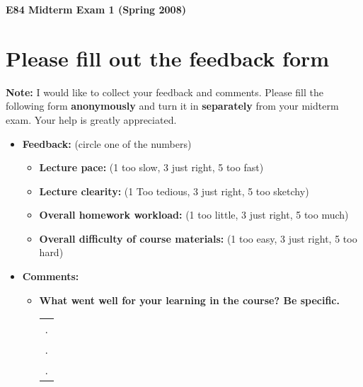 \usepackage{html}

\begin{center}
{\Large \bf  E84 Midterm Exam 1 (Spring 2008)}
\end{center}

\section*{Please fill out the feedback form}

{\bf Note: } I would like to collect your feedback and comments. Please fill
the following form {\bf anonymously} and turn it in {\bf separately} from your 
midterm exam. Your help is greatly appreciated.

\begin{itemize}
\item {\bf Feedback:} (circle one of the numbers)
\begin{itemize}

\item {\bf Lecture pace:} (1 too slow, 3 just right, 5 too fast)


\item {\bf Lecture clearity:} (1 Too tedious, 3 just right, 5 too sketchy)


\item {\bf Overall homework workload:} (1 too little, 3 just right, 5 too much)


\item {\bf Overall difficulty of course materials:} (1 too easy, 3 just right, 5 too hard)

\end{itemize} 

\item {\bf Comments:}
\begin{itemize}

\item {\bf What went well for your learning in the course? Be specific.}

\begin{tabular}{l}
.  \\
.  \\
.  \\
\end{tabular}
\vskip 5cm


\end{itemize}
\end{itemize}
